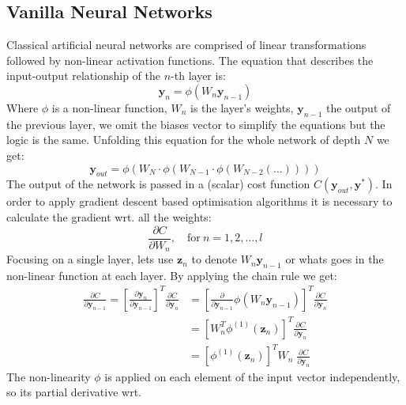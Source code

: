 \documentclass[11pt]{report}
\begin{document}
    \subsection{Vanilla Neural Networks}
    Classical artificial neural networks are comprised of linear transformations followed by non-linear activation functions.
    The equation that describes the input-output relationship of the $n$-th layer is:
    \begin{equation}
        \bm{y}_{n} = \phi( W_{n} \bm{y}_{n-1} )
    \end{equation}
    Where $\phi$ is a non-linear function, $W_n$ is the layer's weights, $\bm{y}_{n-1}$ the output of the previous layer, we omit the biases vector to simplify the equations but the logic is the same.
    Unfolding this equation for the whole network of depth $N$ we get:
    \begin{equation}
        \bm{y}_{out} = \phi ( W_{N} \cdot \phi(W_{N-1} \cdot  \phi(W_{N-2}( \dots ))))
    \end{equation}
    The output of the network is passed in a (scalar) cost function $C(\bm{y}_{out},\bm{y}^*)$.
    In order to apply gradient descent based optimisation algorithms it is necessary to calculate the gradient wrt.
    all the weights:
    \begin{equation}
        \frac{ \partial C}{\partial W_{n} }, \quad \text{for} \ n=1,2,\dots,l
    \end{equation}
    Focusing on a single layer, lets use $\textbf{z}_{n}$ to denote $W_{n} \textbf{y}_{n-1}$ or whats goes in the non-linear function at each layer.
    By applying the chain rule we get:
    \begin{align}
        \frac{ \partial C}{\partial \textbf{y}_{n-1} }
        =
        \left[ \frac{ \partial \textbf{y}_{n}}{\partial \textbf{y}_{n-1}  } \right]^T
        \frac{ \partial C}{\partial \textbf{y}_{n} }
        &=
        \left[ \frac{ \partial}{\partial \textbf{y}_{n-1} } \phi(W_n \textbf{y}_{n-1}) \right]^T
        \frac{ \partial C}{\partial \textbf{y}_{n} }
        \\
        &=
        \left[ W_n^T \phi^{(1)}( \pmb{z}_n ) \right]^T
        \frac{ \partial C}{\partial \textbf{y}_{n} }
        \\
        &=
        \left[ \phi^{(1)}( \pmb{z}_n ) \right]^T
        W_n \;
        \frac{ \partial C}{\partial \textbf{y}_{n} }
    \end{align}
    The non-linearity $\phi$ is applied on each element of the input vector independently, so its partial derivative wrt.
\end{document}
